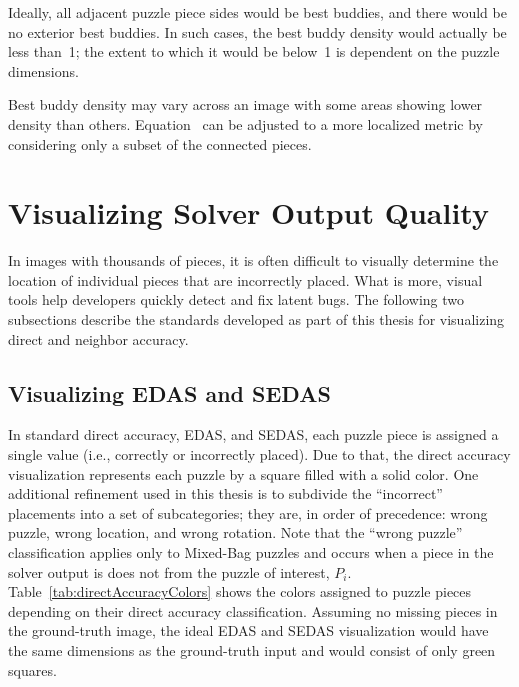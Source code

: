 Ideally, all adjacent puzzle piece sides would be best buddies, and there would be no exterior best buddies. In such cases, the best buddy density would actually be less than~1; the extent to which it would be below~1 is dependent on the puzzle dimensions. 

Best buddy density may vary across an image with some areas showing lower density than others. Equation~ can be adjusted to a more localized metric by considering only a subset of the connected pieces.

\section{Visualizing Solver Output Quality}\label{sec:visualizingSolverAccuracy}

In images with thousands of pieces, it is often difficult to visually determine the location of individual pieces that are incorrectly placed.  What is more, visual tools help developers quickly detect and fix latent bugs.  The following two subsections describe the standards developed as part of this thesis for visualizing direct and neighbor accuracy.

\subsection{Visualizing EDAS and SEDAS}\label{sec:visualizingEdasSedas}

In standard direct accuracy, EDAS, and SEDAS, each puzzle piece is assigned a single value (i.e., correctly or incorrectly placed).  Due to that, the direct accuracy visualization represents each puzzle by a square filled with a solid color.  One additional refinement used in this thesis is to subdivide the ``incorrect'' placements into a set of subcategories; they are, in order of precedence: wrong puzzle, wrong location, and wrong rotation.  Note that the ``wrong puzzle'' classification applies only to Mixed-Bag puzzles and occurs when a piece in the solver output is does not from the puzzle of interest, $P_i$.  Table~\ref{tab:directAccuracyColors} shows the colors assigned to puzzle pieces depending on their direct accuracy classification.  Assuming no missing pieces in the ground-truth image, the ideal EDAS and SEDAS visualization would have the same dimensions as the ground-truth input and would consist of only green squares.

